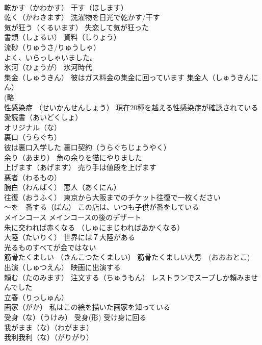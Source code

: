 \documentclass[8pt]{extreport}
\begin{document}
\begin{CJK}{UTF8}{min}
\\	乾かす（かわかす） 干す（ほします） 
\\	乾く（かわきます） 洗濯物を日光で乾かす/干す
\\	気が狂う（くるいます） 失恋して気が狂った
\\	書類（しょるい） 資料（しりょう）
\\	流砂（りゅうさ/りゅうしゃ） 
\\	よく、いらっしゃいました。
\\	氷河（ひょうが） 氷河時代
\\	集金（しゅうきん） 彼はガス料金の集金に回っています 集金人（しゅうきんにん）
\\	(略
\\	性感染症 （せいかんせんしょう） 現在20種を越える性感染症が確認されている
\\	愛読書（あいどくしょ）
\\	オリジナル（な）
\\	裏口（うらぐち） 
\\	彼は裏口入学した 裏口契約（うらぐちじょうやく）
\\	余り（あまり） 魚の余りを猫にやりました
\\	上げます（あげます） 売り手は値段を上げます
\\	悪者（わるもの） 
\\	腕白（わんぱく） 悪人（あくにん） 
\\	往復（おうふく） 東京から大阪までのチケット往復で一枚ください
\\	～を　番する（ばん） この店は、いつも子供が番をしている
\\	メインコース メインコースの後のデザート
\\	朱に交われば赤くなる （しゅにまじわればあかくなる）
\\	大陸（たいりく） 世界には７大陸がある
\\	光るものすべてが金ではない
\\	筋骨たくましい （きんこつたくましい） 筋骨たくましい大男　(おおおとこ)
\\	出演（しゅつえん） 映画に出演する
\\	頼む（たのみます） 注文する（ちゅうもん） レストランでスープしか頼みませんでした
\\	立春（りっしゅん）
\\	画家（がか） 私はこの絵を描いた画家を知っている
\\	受身（な）（うけみ） 受身(形) 受け身に回る
\\	我がまま（な）（わがまま）
\\	我利我利（な）（がりがり）

\end{CJK}
\end{document}
